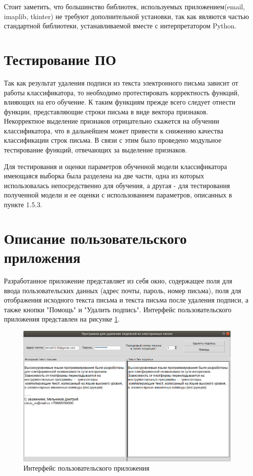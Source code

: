 Стоит заметить, что большинство библиотек, используемых приложением(email, imaplib, tkinter) не требуют дополнительной установки, так как являются частью стандартной библиотеки, устанавливаемой вместе с интерпретатором Python.

\section{Тестирование ПО}

Так как результат удаления подписи из текста электронного письма зависит от работы классификатора, то необходимо протестировать корректность функций, влияющих на его обучение.
К таким функциям прежде всего следует отнести функции, представляющие строки письма в виде вектора признаков. 
Некорректное выделение признаков отрицательно скажется на обучении классификатора, что в дальнейшем может привести к снижению качества классификации строк письма. В связи с этим было проведено модульное тестирование функций, отвечающих за выделение признаков.

Для тестирования и оценки параметров обученной модели классификатора имеющаяся выборка была разделена на две части, одна из которых использовалась непосредственно для обучения, а другая - для тестирования полученной модели и ее оценки с использованием параметров, описанных в пункте 1.5.3.

\section{Описание пользовательского приложения}
Разработанное приложение представляет из себя окно, содержащее поля для ввода пользовательских данных (адрес почты, пароль, номер письма), поля для отображения исходного текста письма и текста письма после удаления подписи, а также кнопки "Помощь" и "Удалить подпись". 
Интерфейс пользовательского приложения представлен на рисунке \ref{impl:interface}. 

\begin{figure}[h!]
	\centering
	\includegraphics[width=\textwidth]{inc/img/interface.png}
	\caption{Интерфейс пользовательского приложения}
	\label{impl:interface}
\end{figure}

